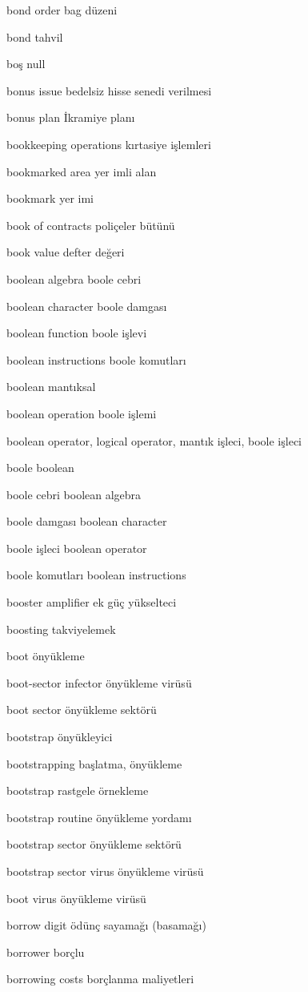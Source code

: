 \documentclass[12pt,fleqn]{article}\usepackage{../../common}
\begin{document}
bond order bag düzeni

bond tahvil

boş null

bonus issue bedelsiz hisse senedi verilmesi

bonus plan İkramiye planı

bookkeeping operations kırtasiye işlemleri

bookmarked area yer imli alan

bookmark yer imi

book of contracts poliçeler bütünü

book value defter değeri

boolean algebra boole cebri

boolean character boole damgası

boolean function boole işlevi

boolean instructions boole komutları

boolean mantıksal

boolean operation boole işlemi

boolean operator, logical operator, mantık işleci, boole işleci

boole boolean

boole cebri boolean algebra

boole damgası boolean character

boole işleci boolean operator

boole komutları boolean instructions

booster amplifier ek güç yükselteci

boosting takviyelemek

boot önyükleme

boot-sector infector önyükleme virüsü

boot sector önyükleme sektörü

bootstrap önyükleyici

bootstrapping başlatma, önyükleme

bootstrap rastgele örnekleme

bootstrap routine önyükleme yordamı

bootstrap sector önyükleme sektörü

bootstrap sector virus önyükleme virüsü

boot virus önyükleme virüsü

borrow digit ödünç sayamağı (basamağı)

borrower borçlu

borrowing costs borçlanma maliyetleri
\end{document}
